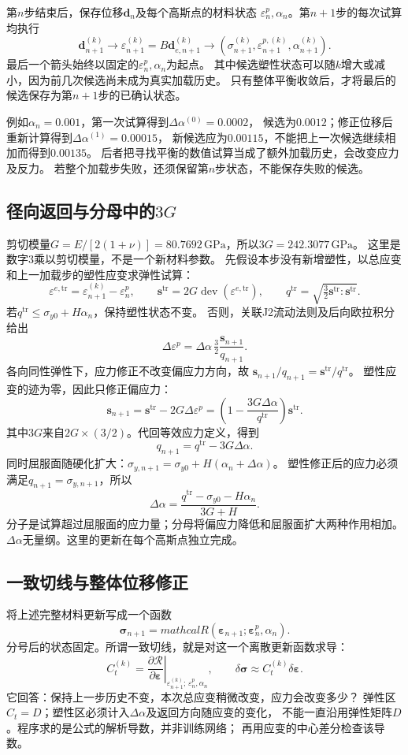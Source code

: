 \documentclass[UTF8,a4paper,fontset=fandol,10pt]{ctexart}
\begin{document}
第$n$步结束后，保存位移$\mathbf d_n$及每个高斯点的材料状态
$\varepsilon^p_n,\alpha_n$。第$n+1$步的每次试算均执行
\[
\mathbf d^{(k)}_{n+1}\longrightarrow
\varepsilon^{(k)}_{n+1}=B\mathbf d^{(k)}_{e,n+1}
\longrightarrow
(\sigma^{(k)}_{n+1},\varepsilon^{p,(k)}_{n+1},\alpha^{(k)}_{n+1}).
\]
最后一个箭头始终以固定的$\varepsilon^p_n,\alpha_n$为起点。
其中候选塑性状态可以随$k$增大或减小，因为前几次候选尚未成为真实加载历史。
只有整体平衡收敛后，才将最后的候选保存为第$n+1$步的已确认状态。

例如$\alpha_n=0.001$，第一次试算得到$\Delta\alpha^{(0)}=0.0002$，
候选为$0.0012$；修正位移后重新计算得到$\Delta\alpha^{(1)}=0.00015$，
新候选应为$0.00115$，不能把上一次候选继续相加而得到$0.00135$。
后者把寻找平衡的数值试算当成了额外加载历史，会改变应力及反力。
若整个加载步失败，还须保留第$n$步状态，不能保存失败的候选。

\subsection{径向返回与分母中的$3G$}
剪切模量$G=E/[2(1+\nu)]=80.7692\,\mathrm{GPa}$，所以$3G=242.3077\,\mathrm{GPa}$。
这里是数字3乘以剪切模量，不是一个新材料参数。
先假设本步没有新增塑性，以总应变和上一加载步的塑性应变求弹性试算：
\[
\varepsilon^{e,\mathrm{tr}}=\varepsilon_{n+1}^{(k)}-\varepsilon^p_n,
\qquad \mathbf s^{\mathrm{tr}}=2G\operatorname{dev}(\varepsilon^{e,\mathrm{tr}}),
\qquad q^{\mathrm{tr}}=\sqrt{\tfrac32\mathbf s^{\mathrm{tr}}:\mathbf s^{\mathrm{tr}}}.
\]
若$q^{\mathrm{tr}}\le\sigma_{y0}+H\alpha_n$，保持塑性状态不变。
否则，关联J2流动法则及后向欧拉积分给出
\[
\Delta\varepsilon^p=\Delta\alpha\,\tfrac32
\frac{\mathbf s_{n+1}}{q_{n+1}}.
\]
各向同性弹性下，应力修正不改变偏应力方向，故
$\mathbf s_{n+1}/q_{n+1}=\mathbf s^{\mathrm{tr}}/q^{\mathrm{tr}}$。
塑性应变的迹为零，因此只修正偏应力：
\[
\mathbf s_{n+1}=\mathbf s^{\mathrm{tr}}-2G\Delta\varepsilon^p
=\left(1-\frac{3G\Delta\alpha}{q^{\mathrm{tr}}}\right)\mathbf s^{\mathrm{tr}}.
\]
其中$3G$来自$2G\times(3/2)$。代回等效应力定义，得到
\[
q_{n+1}=q^{\mathrm{tr}}-3G\Delta\alpha.
\]
同时屈服面随硬化扩大：$\sigma_{y,n+1}=\sigma_{y0}+H(\alpha_n+\Delta\alpha)$。
塑性修正后的应力必须满足$q_{n+1}=\sigma_{y,n+1}$，所以
\[
\boxed{\Delta\alpha=
\frac{q^{\mathrm{tr}}-\sigma_{y0}-H\alpha_n}{3G+H}.}
\]
分子是试算超过屈服面的应力量；分母将偏应力降低和屈服面扩大两种作用相加。
$\Delta\alpha$无量纲。这里的更新在每个高斯点独立完成。

\subsection{一致切线与整体位移修正}
将上述完整材料更新写成一个函数
\[
\boldsymbol\sigma_{n+1}=mathcal R(\boldsymbol\varepsilon_{n+1};
\boldsymbol\varepsilon^p_n,\alpha_n).
\]
分号后的状态固定。所谓一致切线，就是对这一个离散更新函数求导：
\[
C_t^{(k)}=\left.\frac{\partial\mathcal R}{\partial\boldsymbol\varepsilon}\right|_{
\varepsilon_{n+1}^{(k)};\,\varepsilon^p_n,\alpha_n},
\qquad \delta\boldsymbol\sigma\approx C_t^{(k)}\delta\boldsymbol\varepsilon.
\]
它回答：保持上一步历史不变，本次总应变稍微改变，应力会改变多少？
弹性区$C_t=D$；塑性区必须计入$\Delta\alpha$及返回方向随应变的变化，
不能一直沿用弹性矩阵$D$。程序求的是公式的解析导数，并非训练网络；
再用应变的中心差分检查该导数。
\end{document}
